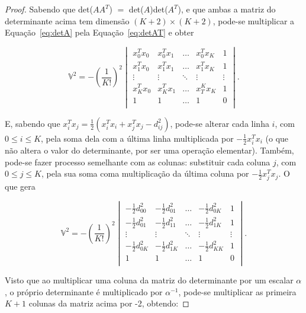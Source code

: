 \begin{teorema}
\begin{proof}
		\noindent Sabendo que det($AA^T$) $=$ det($A$)det($A^T$), e que ambas a matriz do determinante acima tem dimensão $(K+2)\times (K+2)$, pode-se multiplicar a Equação~\ref{eq:detA} pela Equação~\ref{eq:detAT} e obter
		
		\begin{equation*}
			\mathbb{V}^2 = -\left( \frac{1}{K!}\right)^2 
			\begin{vmatrix}
				x_0^Tx_0 & x^T_{0}x_1 & \ldots & x^T_{0}x_K & 1\\ 
				x_1^Tx_0 & x^T_1x_1 & \ldots & x^T_{1}x_K & 1\\ 
				\vdots & \vdots & \ddots & \vdots & \vdots \\ 
				x^T_{K}x_0 & x^T_{K}x_1 & \ldots & x_T^Kx_K & 1\\
				1 & 1 & \ldots & 1 & 0\\ 
			\end{vmatrix}.
		\end{equation*}
		
		\noindent E, sabendo que $x_i^Tx_j = \frac{1}{2}(x_i^Tx_i + x_j^Tx_j - d_{ij}^2)$, pode-se alterar cada linha $i$, com $0 \leq i\leq K$, pela soma dela com a última linha multiplicada por $-\frac{1}{2}x^T_ix_i$ (o que não altera o valor do determinante, por ser uma operação elementar). Também, pode-se fazer processo semelhante com as colunas: substituir cada coluna $j$, com $0\leq j\leq K$, pela sua soma coma multiplicação da última coluna por $-\frac{1}{2}x^T_jx_j$. O que gera
		
		\begin{equation*}
			\mathbb{V}^2 = -\left( \frac{1}{K!}\right)^2 
			\begin{vmatrix}
				-\frac{1}{2}d^2_{00} & -\frac{1}{2}d^2_{01} & \ldots & -\frac{1}{2}d^2_{0K} & 1\\ 
				-\frac{1}{2}d^2_{01} & -\frac{1}{2}d^2_{11} & \ldots & -\frac{1}{2}d^2_{1K} & 1\\ 
				\vdots & \vdots & \ddots & \vdots & \vdots \\ 
				-\frac{1}{2}d^2_{0K} & -\frac{1}{2}d^2_{1K} & \ldots & -\frac{1}{2}d^2_{KK} & 1\\
				1 & 1 & \ldots & 1 & 0\\ 
			\end{vmatrix}.
		\end{equation*}
		
		\noindent Visto que ao multiplicar uma coluna da matriz do determinante por um escalar $\alpha$, o próprio determinante é multiplicado por $\alpha^{-1}$, pode-se multiplicar as primeira $K+1$ colunas da matriz acima por -2, obtendo:
		

\end{proof}
\end{teorema}
